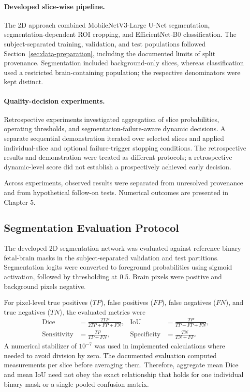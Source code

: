 \paragraph{Developed slice-wise pipeline.}
The 2D approach combined MobileNetV3-Large U-Net segmentation, segmentation-dependent ROI cropping, and EfficientNet-B0 classification. The subject-separated training, validation, and test populations followed Section~\ref{sec:data-preparation}, including the documented limits of split provenance. Segmentation included background-only slices, whereas classification used a restricted brain-containing population; the respective denominators were kept distinct.

\paragraph{Quality-decision experiments.}
Retrospective experiments investigated aggregation of slice probabilities, operating thresholds, and segmentation-failure-aware dynamic decisions. A separate sequential demonstration iterated over selected slices and applied individual-slice and optional failure-trigger stopping conditions. The retrospective results and demonstration were treated as different protocols; a retrospective dynamic-level score did not establish a prospectively achieved early decision.

Across experiments, observed results were separated from unresolved provenance and from hypothetical follow-on tests. Numerical outcomes are presented in Chapter 5.

\subsection{Segmentation Evaluation Protocol}
\label{subsec:segmentation-evaluation}

The developed 2D segmentation network was evaluated against reference binary fetal-brain masks in the subject-separated validation and test partitions. Segmentation logits were converted to foreground probabilities using sigmoid activation, followed by thresholding at 0.5. Brain pixels were positive and background pixels negative.

For pixel-level true positives ($TP$), false positives ($FP$), false negatives ($FN$), and true negatives ($TN$), the evaluated metrics were
\begin{align}
\mathrm{Dice} &= \frac{2TP}{2TP+FP+FN}, &
\mathrm{IoU} &= \frac{TP}{TP+FP+FN},\\
\mathrm{Sensitivity} &= \frac{TP}{TP+FN}, &
\mathrm{Specificity} &= \frac{TN}{TN+FP}.
\end{align}
A numerical stabilizer of $10^{-7}$ was used in implemented calculations where needed to avoid division by zero. The documented evaluation computed measurements per slice before averaging them. Therefore, aggregate mean Dice and mean IoU need not obey the exact relationship that holds for one individual binary mask or a single pooled confusion matrix.


